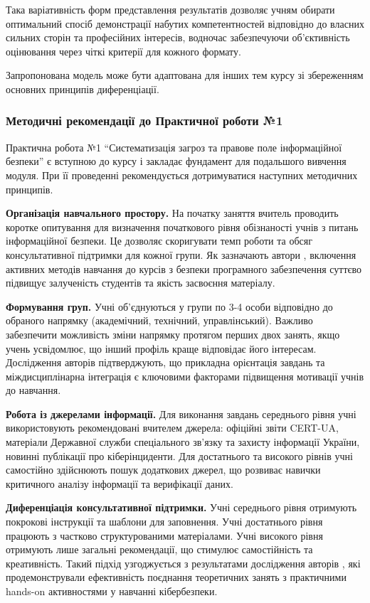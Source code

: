 Така варіативність форм представлення результатів дозволяє учням обирати оптимальний спосіб демонстрації набутих компетентностей відповідно до власних сильних сторін та професійних інтересів, водночас забезпечуючи об'єктивність оцінювання через чіткі критерії для кожного формату.

Запропонована модель може бути адаптована для інших тем курсу зі збереженням основних принципів диференціації.

\subsubsection{Методичні рекомендації до Практичної роботи №1 }

Практична робота №1 ``Систематизація загроз та правове поле інформаційної безпеки'' є вступною до курсу і закладає фундамент для подальшого вивчення модуля. При її проведенні рекомендується дотримуватися наступних методичних принципів.

\textbf{Організація навчального простору.} На початку заняття вчитель проводить коротке опитування для визначення початкового рівня обізнаності учнів з питань інформаційної безпеки. Це дозволяє скоригувати темп роботи та обсяг консультативної підтримки для кожної групи. Як зазначають автори \cite{Srivatanakul202225}, включення активних методів навчання до курсів з безпеки програмного забезпечення суттєво підвищує залученість студентів та якість засвоєння матеріалу.

\textbf{Формування груп.} Учні об'єднуються у групи по 3-4 особи відповідно до обраного напрямку (академічний, технічний, управлінський). Важливо забезпечити можливість зміни напрямку протягом перших двох занять, якщо учень усвідомлює, що інший профіль краще відповідає його інтересам. Дослідження авторів \cite{Nikitin20204931} підтверджують, що прикладна орієнтація завдань та міждисциплінарна інтеграція є ключовими факторами підвищення мотивації учнів до навчання.

\textbf{Робота із джерелами інформації.} Для виконання завдань середнього рівня учні використовують рекомендовані вчителем джерела: офіційні звіти CERT-UA, матеріали Державної служби спеціального зв'язку та захисту інформації України, новинні публікації про кіберінциденти. Для достатнього та високого рівнів учні самостійно здійснюють пошук додаткових джерел, що розвиває навички критичного аналізу інформації та верифікації даних.

\textbf{Диференціація консультативної підтримки.} Учні середнього рівня отримують покрокові інструкції та шаблони для заповнення. Учні достатнього рівня працюють з частково структурованими матеріалами. Учні високого рівня отримують лише загальні рекомендації, що стимулює самостійність та креативність. Такий підхід узгоджується з результатами дослідження авторів \cite{Toccafondi2024307}, які продемонстрували ефективність поєднання теоретичних занять з практичними hands-on активностями у навчанні кібербезпеки.

